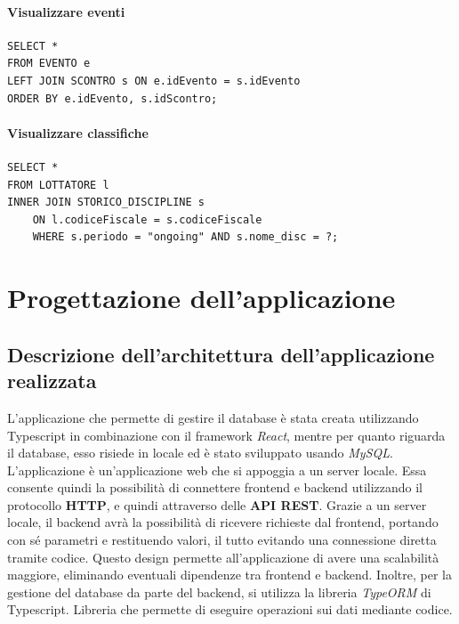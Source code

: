 \documentclass[a4paper,12pt]{report}
\begin{document}
\subsubsection{Visualizzare eventi}
\begin{verbatim}
SELECT *
FROM EVENTO e
LEFT JOIN SCONTRO s ON e.idEvento = s.idEvento
ORDER BY e.idEvento, s.idScontro;
\end{verbatim}
\subsubsection{Visualizzare classifiche}
\begin{verbatim}
SELECT *
FROM LOTTATORE l
INNER JOIN STORICO_DISCIPLINE s
    ON l.codiceFiscale = s.codiceFiscale
    WHERE s.periodo = "ongoing" AND s.nome_disc = ?;
\end{verbatim}

\chapter{Progettazione dell'applicazione}
\section{Descrizione dell'architettura dell'applicazione realizzata}
L'applicazione che permette di gestire il database è stata creata utilizzando \textrm{Typescript} in combinazione con il framework 
\emph{React}, mentre per quanto riguarda il database, esso risiede in locale ed è stato sviluppato usando \emph{MySQL}.
L'applicazione è un'applicazione web che si appoggia a un server locale. Essa consente quindi la possibilità di connettere 
frontend e backend utilizzando il protocollo \textbf{HTTP}, e quindi attraverso delle \textbf{API REST}. Grazie a un server locale, 
il backend avrà la possibilità di ricevere richieste dal frontend, portando con sé parametri e restituendo valori, il tutto 
evitando una connessione diretta tramite codice. Questo design permette all'applicazione di avere una scalabilità maggiore, eliminando 
eventuali dipendenze tra frontend e backend. Inoltre, per la gestione del database da parte del backend, si utilizza la libreria 
\emph{TypeORM} di \textrm{Typescript}. Libreria che permette di eseguire operazioni sui dati mediante codice.
\end{document}

